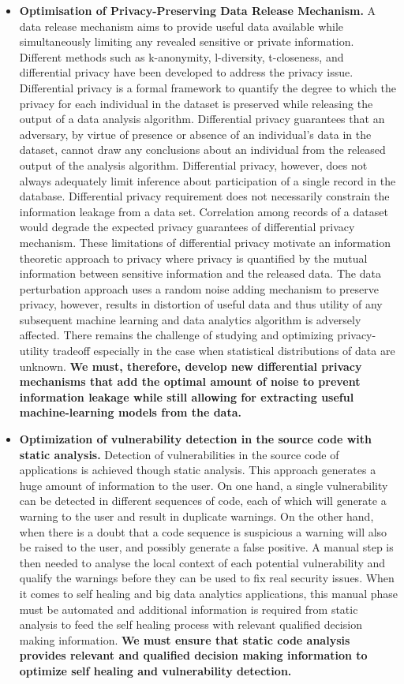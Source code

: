 \documentclass[a4paper,11pt]{article}
\begin{document}
\begin{itemize}
\item \textbf{Optimisation of Privacy-Preserving Data Release Mechanism.} A data release mechanism aims to provide useful data available while simultaneously limiting any revealed sensitive or private information. Different methods such as k-anonymity, l-diversity, t-closeness, and differential privacy have been developed to address the privacy issue. Differential privacy is a formal framework to quantify the degree to which the privacy for each individual in the dataset is preserved while releasing the output of a data analysis algorithm. Differential privacy guarantees that an adversary, by virtue of presence or absence of an individual's data in the dataset, cannot draw any conclusions about an individual from the released output of the analysis algorithm. Differential privacy, however, does not always adequately limit inference about participation of a single record in the database. Differential privacy requirement does not necessarily constrain the information leakage from a data set. Correlation among records of a dataset would degrade the expected privacy guarantees of differential privacy mechanism. These limitations of differential privacy motivate an information theoretic approach to privacy where privacy is quantified by the mutual information between sensitive information and the released data. The data perturbation approach uses a random noise adding mechanism to preserve privacy, however, results in distortion of useful data and thus utility of any subsequent machine learning and data analytics algorithm is adversely affected. There remains the challenge of studying and optimizing privacy-utility tradeoff especially in the case when statistical distributions of data are unknown. \textbf{We must, therefore, develop new differential privacy mechanisms that add the optimal amount of noise to prevent information leakage while still allowing for extracting useful machine-learning models from the data.}

\item {\textbf{Optimization of vulnerability detection in the source code with static analysis.}} Detection of vulnerabilities in the source code of applications is achieved though static analysis. This approach generates a huge amount of information to the user. On one hand, a single vulnerability can be detected in different sequences of code, each of which will generate a warning to the user and result in duplicate warnings. On the other hand, when there is a doubt that a code sequence is suspicious a warning will also be raised to the user, and possibly generate a false positive. A manual step is then needed to analyse the local context of each potential vulnerability and qualify the warnings before they can be used to fix real security issues. When it comes to self healing and big data analytics applications, this manual phase must be automated and additional information is required from static analysis to feed the self healing process with relevant qualified decision making information.
\textbf{We must ensure that static code analysis provides relevant and qualified decision making information to optimize self healing and vulnerability detection.} 


\end{itemize}
\end{document}
